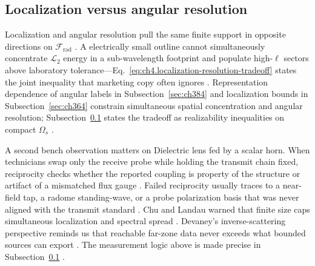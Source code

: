 \subsection{Localization versus angular resolution}
\label{sec:ch474}
Localization and angular resolution pull the same finite support in opposite directions on $\mathcal{F}_{\mathrm{rad}}$ \cite{stratton1941}. A electrically small outline cannot simultaneously concentrate $\mathcal{L}_{2}$ energy in a sub-wavelength footprint and populate high-$\ell$ sectors above laboratory tolerance---Eq.~\eqref{eq:ch4.localization-resolution-tradeoff} states the joint inequality that marketing copy often ignores \cite{harrington2001}. Representation dependence of angular labels in Subsection~\ref{sec:ch384} and localization bounds in Subsection~\ref{sec:ch364} constrain simultaneous spatial concentration and angular resolution; Subsection~\ref{sec:ch474} states the tradeoff as realizability inequalities on compact $\Omega_{s}$ \cite{devaney2004}.
\begin{physicalvignette}
A second bench observation matters on Dielectric lens fed by a scalar horn. When technicians swap only the receive probe while holding the transmit chain fixed, reciprocity checks whether the reported coupling is property of the structure or artifact of a mismatched flux gauge \cite{stratton1941}. Failed reciprocity usually traces to a near-field tap, a radome standing-wave, or a probe polarization basis that was never aligned with the transmit standard \cite{hansen1988}.
Chu and Landau warned that finite size caps simultaneous localization and spectral spread \cite{chu1948}. Devaney's inverse-scattering perspective reminds us that reachable far-zone data never exceeds what bounded sources can export \cite{devaney2004}.
The measurement logic above is made precise in Subsection~\ref{sec:ch474} \cite{stratton1941}.
\end{physicalvignette}
